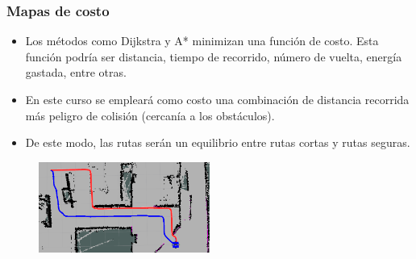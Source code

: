 \begin{frame}\frametitle{Mapas de costo}
  \begin{itemize}
  \item Los métodos como Dijkstra y A* minimizan una función de costo. Esta función podría ser distancia, tiempo de recorrido, número de vuelta, energía gastada, entre otras.
  \item En este curso se empleará como costo una combinación de distancia recorrida más peligro de colisión (cercanía a los obstáculos).
  \item De este modo, las rutas serán un equilibrio entre rutas cortas y rutas seguras.
  \end{itemize}
  \begin{figure}
    \centering
    \includegraphics[width=0.5\textwidth]{Figures/AStarComparison.png}
  \end{figure}
\end{frame}

